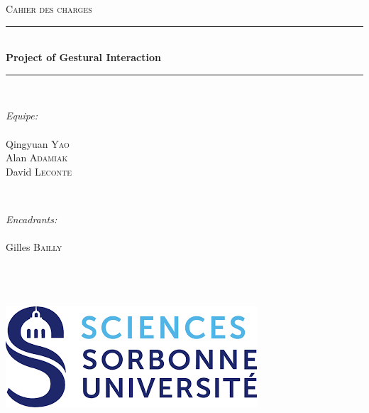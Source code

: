 \documentclass[12pt]{article}
\begin{document}
\begin{titlepage}

\newcommand{\HRule}{\rule{\linewidth}{0.5mm}} 
\center


\textsc{\Large Cahier des charges}\\[0.5cm]

\HRule \\[0.4cm]
{\huge \bfseries Project of Gestural Interaction}\\[0.4cm] 
\HRule \\[1.5cm]


\begin{minipage}{0.4\textwidth}
\begin{flushleft} \large
\emph{Equipe:}\\~\\
Qingyuan \textsc{Yao}\\
Alan \textsc{Adamiak}\\
David \textsc{Leconte}\\
\end{flushleft}
\end{minipage}
~
\begin{minipage}{0.4\textwidth}
\begin{flushright} \large
\emph{Encadrants:} \\~\\
Gilles \textsc{Bailly}\\~\\~\\
\end{flushright}
\end{minipage}\\[2cm]


\includegraphics[scale=0.5]{logo.png}\\[1cm] 

\vfill

\end{titlepage}





\newpage

\renewcommand{\contentsname}{Sommaire}
\tableofcontents
\newpage
\end{document}

